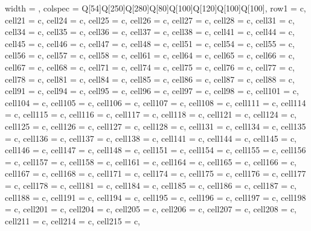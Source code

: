 
\tiny
\begin{longtblr}[
  label = none,
  entry = none,
]{
  width = \linewidth,
  colspec = {Q[54]Q[250]Q[280]Q[80]Q[100]Q[120]Q[100]Q[100]},
  row{1} = {c},
  cell{2}{1} = {c},
  cell{2}{4} = {c},
  cell{2}{5} = {c},
  cell{2}{6} = {c},
  cell{2}{7} = {c},
  cell{2}{8} = {c},
  cell{3}{1} = {c},
  cell{3}{4} = {c},
  cell{3}{5} = {c},
  cell{3}{6} = {c},
  cell{3}{7} = {c},
  cell{3}{8} = {c},
  cell{4}{1} = {c},
  cell{4}{4} = {c},
  cell{4}{5} = {c},
  cell{4}{6} = {c},
  cell{4}{7} = {c},
  cell{4}{8} = {c},
  cell{5}{1} = {c},
  cell{5}{4} = {c},
  cell{5}{5} = {c},
  cell{5}{6} = {c},
  cell{5}{7} = {c},
  cell{5}{8} = {c},
  cell{6}{1} = {c},
  cell{6}{4} = {c},
  cell{6}{5} = {c},
  cell{6}{6} = {c},
  cell{6}{7} = {c},
  cell{6}{8} = {c},
  cell{7}{1} = {c},
  cell{7}{4} = {c},
  cell{7}{5} = {c},
  cell{7}{6} = {c},
  cell{7}{7} = {c},
  cell{7}{8} = {c},
  cell{8}{1} = {c},
  cell{8}{4} = {c},
  cell{8}{5} = {c},
  cell{8}{6} = {c},
  cell{8}{7} = {c},
  cell{8}{8} = {c},
  cell{9}{1} = {c},
  cell{9}{4} = {c},
  cell{9}{5} = {c},
  cell{9}{6} = {c},
  cell{9}{7} = {c},
  cell{9}{8} = {c},
  cell{10}{1} = {c},
  cell{10}{4} = {c},
  cell{10}{5} = {c},
  cell{10}{6} = {c},
  cell{10}{7} = {c},
  cell{10}{8} = {c},
  cell{11}{1} = {c},
  cell{11}{4} = {c},
  cell{11}{5} = {c},
  cell{11}{6} = {c},
  cell{11}{7} = {c},
  cell{11}{8} = {c},
  cell{12}{1} = {c},
  cell{12}{4} = {c},
  cell{12}{5} = {c},
  cell{12}{6} = {c},
  cell{12}{7} = {c},
  cell{12}{8} = {c},
  cell{13}{1} = {c},
  cell{13}{4} = {c},
  cell{13}{5} = {c},
  cell{13}{6} = {c},
  cell{13}{7} = {c},
  cell{13}{8} = {c},
  cell{14}{1} = {c},
  cell{14}{4} = {c},
  cell{14}{5} = {c},
  cell{14}{6} = {c},
  cell{14}{7} = {c},
  cell{14}{8} = {c},
  cell{15}{1} = {c},
  cell{15}{4} = {c},
  cell{15}{5} = {c},
  cell{15}{6} = {c},
  cell{15}{7} = {c},
  cell{15}{8} = {c},
  cell{16}{1} = {c},
  cell{16}{4} = {c},
  cell{16}{5} = {c},
  cell{16}{6} = {c},
  cell{16}{7} = {c},
  cell{16}{8} = {c},
  cell{17}{1} = {c},
  cell{17}{4} = {c},
  cell{17}{5} = {c},
  cell{17}{6} = {c},
  cell{17}{7} = {c},
  cell{17}{8} = {c},
  cell{18}{1} = {c},
  cell{18}{4} = {c},
  cell{18}{5} = {c},
  cell{18}{6} = {c},
  cell{18}{7} = {c},
  cell{18}{8} = {c},
  cell{19}{1} = {c},
  cell{19}{4} = {c},
  cell{19}{5} = {c},
  cell{19}{6} = {c},
  cell{19}{7} = {c},
  cell{19}{8} = {c},
  cell{20}{1} = {c},
  cell{20}{4} = {c},
  cell{20}{5} = {c},
  cell{20}{6} = {c},
  cell{20}{7} = {c},
  cell{20}{8} = {c},
  cell{21}{1} = {c},
  cell{21}{4} = {c},
  cell{21}{5} = {c},
}
\end{longtblr}
